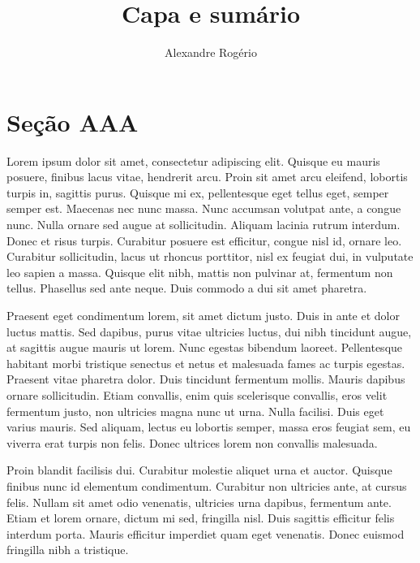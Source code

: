 \documentclass{article}
\begin{document}
	\title{\textbf{{\Huge Capa e sumário}}}
	\author{Alexandre Rogério}
	\maketitle %
	\thispagestyle{empty} %
	\newpage
	
	\setcounter{page}{1} %
	\tableofcontents %
	\newpage
	
	\setcounter{page}{1}
	\section{Seção AAA}
	
	Lorem ipsum dolor sit amet, consectetur adipiscing elit. Quisque eu mauris posuere, finibus lacus vitae, hendrerit arcu. Proin sit amet arcu eleifend, lobortis turpis in, sagittis purus. Quisque mi ex, pellentesque eget tellus eget, semper semper est. Maecenas nec nunc massa. Nunc accumsan volutpat ante, a congue nunc. Nulla ornare sed augue at sollicitudin. Aliquam lacinia rutrum interdum. Donec et risus turpis. Curabitur posuere est efficitur, congue nisl id, ornare leo. Curabitur sollicitudin, lacus ut rhoncus porttitor, nisl ex feugiat dui, in vulputate leo sapien a massa. Quisque elit nibh, mattis non pulvinar at, fermentum non tellus. Phasellus sed ante neque. Duis commodo a dui sit amet pharetra.
	
	
	Praesent eget condimentum lorem, sit amet dictum justo. Duis in ante et dolor luctus mattis. Sed dapibus, purus vitae ultricies luctus, dui nibh tincidunt augue, at sagittis augue mauris ut lorem. Nunc egestas bibendum laoreet. Pellentesque habitant morbi tristique senectus et netus et malesuada fames ac turpis egestas. Praesent vitae pharetra dolor. Duis tincidunt fermentum mollis. Mauris dapibus ornare sollicitudin. Etiam convallis, enim quis scelerisque convallis, eros velit fermentum justo, non ultricies magna nunc ut urna. Nulla facilisi. Duis eget varius mauris. Sed aliquam, lectus eu lobortis semper, massa eros feugiat sem, eu viverra erat turpis non felis. Donec ultrices lorem non convallis malesuada.
	
	
	Proin blandit facilisis dui. Curabitur molestie aliquet urna et auctor. Quisque finibus nunc id elementum condimentum. Curabitur non ultricies ante, at cursus felis. Nullam sit amet odio venenatis, ultricies urna dapibus, fermentum ante. Etiam et lorem ornare, dictum mi sed, fringilla nisl. Duis sagittis efficitur felis interdum porta. Mauris efficitur imperdiet quam eget venenatis. Donec euismod fringilla nibh a tristique.
	
\end{document}
